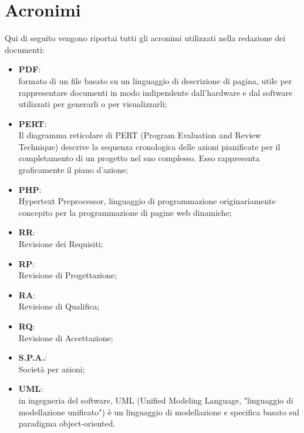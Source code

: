 \section*{Acronimi}
Qui di seguito vengono riportai tutti gli acronimi utilizzati nella redazione dei documenti:
\begin{itemize}
\itemsep2em
\item \textbf{PDF}:\\ formato di un file basato su un linguaggio di descrizione di pagina, utile per rappresentare documenti in modo indipendente dall'hardware e dal software utilizzati per generarli o per visualizzarli;
\item \textbf{PERT}:\\ Il diagramma reticolare di PERT (Program Evaluation and Review Technique) descrive la sequenza cronologica delle azioni pianificate per il completamento di un progetto nel suo complesso. Esso rappresenta graficamente il piano d’azione;
\item \textbf{PHP}:\\ Hypertext Preprocessor, linguaggio di programmazione originariamente concepito per la programmazione di pagine web dinamiche;
\item \textbf{RR}:\\ Revisione dei Requisiti;
\item \textbf{RP}:\\ Revisione di Progettazione;
\item \textbf{RA}:\\ Revisione di Qualifica;
\item \textbf{RQ}:\\ Revisione di Accettazione;
\item \textbf{S.P.A.}:\\ Società per azioni;
\item \textbf{UML}:\\ in ingegneria del software, UML (Unified Modeling Language, "linguaggio di modellazione unificato") è un linguaggio di modellazione e specifica basato sul paradigma object-oriented.
\end{itemize}
